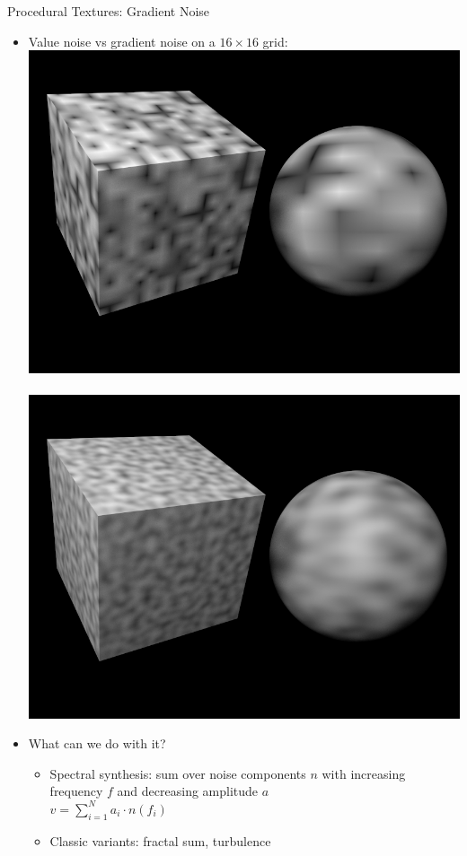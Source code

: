 \documentclass[utf8,stillsansserifmath,fleqn,t]{beamer}
\newcommand{\ds}{\displaystyle}
\begin{document}
\begin{frame}
\frametitle{\insertsection}
Procedural Textures: Gradient Noise
\begin{itemize}
\item Value noise vs gradient noise on a $16\times 16$ grid:
\includegraphics[width=.45\textwidth]{./fig/noise-example-value.png}~~
\includegraphics[width=.45\textwidth]{./fig/noise-example-gradient.png}
\item What can we do with it?
\begin{itemize}
\item Spectral synthesis: sum over noise components $n$ with increasing frequency $f$ and decreasing
    amplitude $a$ \\
    $\ds v=\sum_{i=1}^{N} a_i \cdot n(f_i)$
\item Classic variants: fractal sum, turbulence
\end{itemize}
\end{itemize}
\end{frame}
\end{document}
